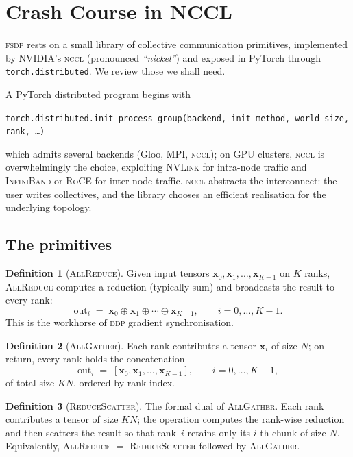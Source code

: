 \documentclass[11pt,a4paper]{article}
\theoremstyle{definition}
\newtheorem{definition}{Definition}[section]
\theoremstyle{remark}
\newcommand{\FSDP}{\textsc{fsdp}}
\newcommand{\DDP}{\textsc{ddp}}
\newcommand{\NCCL}{\textsc{nccl}}
\newcommand{\AllGather}{\textsc{AllGather}}
\newcommand{\ReduceScatter}{\textsc{ReduceScatter}}
\newcommand{\AllReduce}{\textsc{AllReduce}}
\newcommand{\code}[1]{\texttt{\small #1}}
\begin{document}
\section{Crash Course in NCCL}


\FSDP{} rests on a small library of collective communication primitives, implemented by NVIDIA's \NCCL{} (pronounced \textit{``nickel''}) and exposed in PyTorch through \code{torch.distributed}. We review those we shall need.


A PyTorch distributed program begins with
\begin{center}
\code{torch.distributed.init\_process\_group(backend, init\_method, world\_size, rank, \dots)}
\end{center}
which admits several backends (Gloo, MPI, \NCCL{}); on GPU clusters, \NCCL{} is overwhelmingly the choice, exploiting \textsc{NVLink} for intra-node traffic and \textsc{InfiniBand} or \textsc{RoCE} for inter-node traffic. \NCCL{} abstracts the interconnect: the user writes collectives, and the library chooses an efficient realisation for the underlying topology.

\subsection{The primitives}

\begin{definition}[\AllReduce{}]
Given input tensors $\bm{x}_0, \bm{x}_1, \dots, \bm{x}_{K-1}$ on $K$ ranks, \AllReduce{} computes a reduction (typically sum) and broadcasts the result to every rank:
\[
    \text{out}_i \;=\; \bm{x}_0 \oplus \bm{x}_1 \oplus \cdots \oplus \bm{x}_{K-1}, \qquad i = 0, \dots, K-1.
\]
This is the workhorse of \DDP{} gradient synchronisation.
\end{definition}

\begin{definition}[\AllGather{}]
Each rank contributes a tensor $\bm{x}_i$ of size $N$; on return, every rank holds the concatenation
\[
    \text{out}_i \;=\; [\bm{x}_0, \bm{x}_1, \dots, \bm{x}_{K-1}], \qquad i = 0, \dots, K-1,
\]
of total size $KN$, ordered by rank index.
\end{definition}

\begin{definition}[\ReduceScatter{}]
The formal dual of \AllGather{}. Each rank contributes a tensor of size $KN$; the operation computes the rank-wise reduction and then scatters the result so that rank~$i$ retains only its $i$-th chunk of size $N$. Equivalently, \AllReduce{} $=$ \ReduceScatter{} followed by \AllGather{}.
\end{definition}
\end{document}
